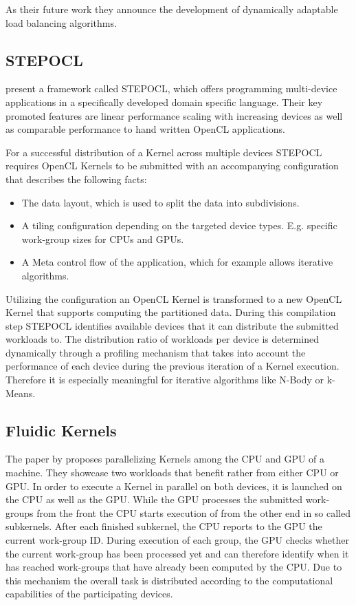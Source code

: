 As their future work they announce the development of dynamically adaptable load balancing algorithms.


\subsection*{STEPOCL}

\citeauthor{stepocl} present a framework called STEPOCL, which offers programming multi-device applications in a specifically developed domain specific language\cite{stepocl}. Their key promoted features are linear performance scaling with increasing devices as well as comparable performance to hand written OpenCL applications.

For a successful distribution of a Kernel across multiple devices STEPOCL requires OpenCL Kernels to be submitted with an accompanying configuration that describes the following facts:
\begin{itemize}
    \item The data layout, which is used to split the data into subdivisions.
    \item A tiling configuration depending on the targeted device types. E.g. specific work-group sizes for CPUs and GPUs.
    \item A Meta control flow of the application, which for example allows iterative algorithms.
\end{itemize}

Utilizing the configuration an OpenCL Kernel is transformed to a new OpenCL Kernel that supports computing the partitioned data. During this compilation step STEPOCL identifies available devices that it can distribute the submitted workloads to. The distribution ratio of workloads per device is determined dynamically through a profiling mechanism that takes into account the performance of each device during the previous iteration of a Kernel execution. Therefore it is especially meaningful for iterative algorithms like N-Body or k-Means.

\subsection*{Fluidic Kernels}

The paper by \citeauthor{fluidic} proposes parallelizing Kernels among the CPU and GPU of a machine\cite{fluidic}. They showcase two workloads that benefit rather from either CPU or GPU. In order to execute a Kernel in parallel on both devices, it is launched on the CPU as well as the GPU. While the GPU processes the submitted work-groups from the front the CPU starts execution of from the other end in so called subkernels. After each finished subkernel, the CPU reports to the GPU the current work-group ID. During execution of each group, the GPU checks whether the current work-group has been processed yet and can therefore identify when it has reached work-groups that have already been computed by the CPU. Due to this mechanism the overall task is distributed according to the computational capabilities of the participating devices.


